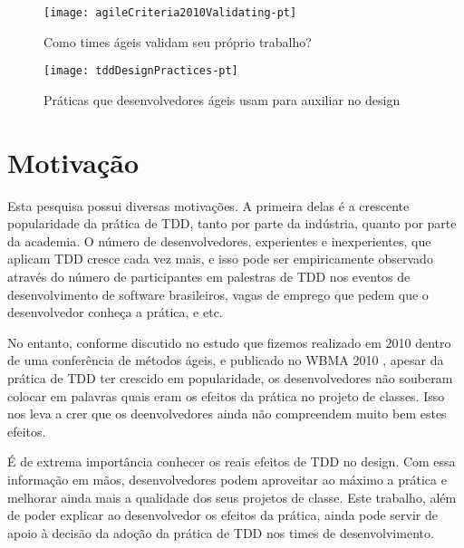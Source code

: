\begin{figure}[ht]
  \begin{minipage}[b]{0.45\linewidth}
    \centering
    \texttt{[image: agileCriteria2010Validating-pt]}
    \caption{Como times ágeis validam seu próprio trabalho?}
    \label{fig:wambler-agile-2010}
  \end{minipage}
  \hspace{0.5cm}
  \begin{minipage}[b]{0.45\linewidth}
    \centering
    \texttt{[image: tddDesignPractices-pt]}
    \caption{Práticas que desenvolvedores ágeis usam para auxiliar no design}  
    \label{fig:wambler-tdd-2008}
  \end{minipage}
\end{figure}			

\section{Motivação}

Esta pesquisa possui diversas motivações. A primeira delas é a crescente
popularidade da prática de TDD, tanto por parte da indústria, quanto 
por parte da academia. O número de desenvolvedores, experientes e inexperientes,
que aplicam TDD cresce cada vez mais, e isso pode ser empiricamente
observado através do número de participantes em palestras de TDD nos
eventos de desenvolvimento de software brasileiros, vagas de emprego
que pedem que o desenvolvedor conheça a prática, e etc.

No entanto, conforme discutido no estudo que fizemos 
realizado em 2010 dentro de uma conferência de 
métodos ágeis, e publicado no WBMA 2010 \cite{aniche-wbma}, apesar da prática de 
TDD ter crescido em popularidade, os desenvolvedores não souberam
colocar em palavras quais eram os efeitos da prática no projeto de classes.
Isso nos leva a crer que os deenvolvedores ainda 
não compreendem muito bem estes efeitos.

É de extrema importância conhecer os reais efeitos de TDD no design. Com essa
informação em mãos, desenvolvedores podem aproveitar ao máximo
a prática e melhorar ainda mais a qualidade dos seus projetos
de classe. 
Este trabalho, além de poder explicar ao desenvolvedor os efeitos
da prática, ainda pode servir de apoio à decisão da adoção da prática
de TDD nos times de desenvolvimento.

